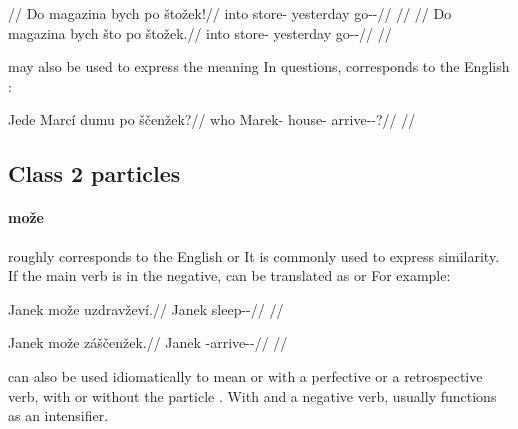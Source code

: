 \pex
\a
\begingl
	\glpreamble {}//
	\gla Do magazina bych po štožek!//
	\glb into store-\Acc{} yesterday \Ipfv{} go-\Av{}-\Pf{}//
	\glft {}//
\endgl
\a
\begingl
	\glpreamble {}//
	\gla Do magazina bych što po štožek.//
	\glb into store-\Acc{} yesterday \Aff{} \Ipfv{} go-\Av{}-\Pf{}//
	\glft {}//
\endgl
\xe

 may also be used to express the meaning  In
questions,  corresponds to the English :

\pex
\begingl
	\gla Jede Marcí dumu po ščenžek?//
	\glb who Marek-\Gen{} house-\Ins{} \Ipfv{} arrive-\Av{}-\Pf{}?//
	\glft {}//
\endgl
\xe

\subsection{Class 2 particles}\label{sec:class2-particles}

\paragraph{može}  roughly corresponds to the English  or
 It is commonly used to express similarity. If the main verb is in
the negative,  can be translated as  or 
For example:

\pex
\begingl
	\gla Janek može uzdravževí.//
	\glb Janek \Add{} sleep-\Av{}-\Cont{}//
	\glft {}//
\endgl
\xe

\pex
\begingl
	\gla Janek može záščenžek.//
	\glb Janek \Add{} \Neg{}-arrive-\Av{}-\Pf{}//
	\glft {}//
\endgl
\xe

 can also be used idiomatically to mean  or  with a perfective or a retrospective verb, with or without the particle
. With  and a negative verb,  usually functions as an
intensifier. 

